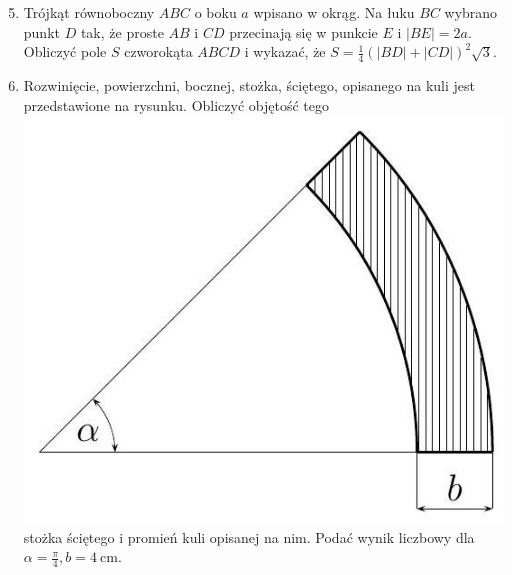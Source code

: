 \documentclass[10pt]{article}
\begin{document}
\begin{enumerate}
  \setcounter{enumi}{4}
  \item Trójkąt równoboczny $A B C$ o boku $a$ wpisano w okrąg. Na łuku $B C$ wybrano punkt $D$ tak, że proste $A B$ i $C D$ przecinają się w punkcie $E$ i $|B E|=2 a$. Obliczyć pole $S$ czworokąta $A B C D$ i wykazać, że $S=\frac{1}{4}(|B D|+|C D|)^{2} \sqrt{3}$.
  \item Rozwinięcie, powierzchni, bocznej, stożka, ściętego, opisanego na kuli jest przedstawione na rysunku. Obliczyć objętość tego\\
\includegraphics[max width=\textwidth, center]{2024_11_16_48a1022099522e94246ag-16}\\
stożka ściętego i promień kuli opisanej na nim. Podać wynik liczbowy dla $\alpha=\frac{\pi}{4}, b=4 \mathrm{~cm}$.
\end{enumerate}
\end{document}
